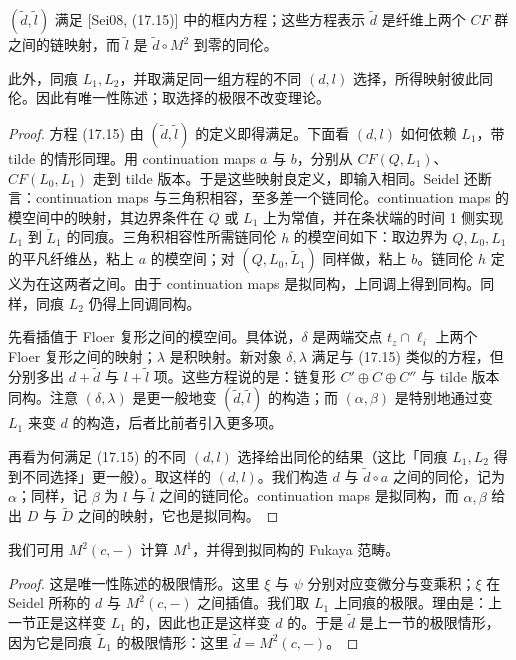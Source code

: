 \begin{claim}\label{claim:boxed}
$(\tilde d,\tilde l)$ 满足 [Sei08, (17.15)] 中的框内方程；这些方程表示 $\tilde d$ 是纤维上两个 $CF$ 群之间的链映射，而 $\tilde l$ 是 $\tilde d\circ M^2$ 到零的同伦。
\end{claim}

此外，同痕 $L_1,L_2$，并取满足同一组方程的不同 $(d,l)$ 选择，所得映射彼此同伦。因此有唯一性陈述；取选择的极限不改变理论。

\begin{proof}
方程 (17.15) 由 $(\tilde d,\tilde l)$ 的定义即得满足。下面看 $(d,l)$ 如何依赖 $L_1$，带 tilde 的情形同理。用 continuation maps $a$ 与 $b$，分别从 $CF(Q,L_1)$、$CF(L_0,L_1)$ 走到 tilde 版本。于是这些映射良定义，即输入相同。Seidel 还断言：continuation maps 与三角积相容，至多差一个链同伦。continuation maps 的模空间中的映射，其边界条件在 $Q$ 或 $L_1$ 上为常值，并在条状端的时间 1 侧实现 $L_1$ 到 $\tilde L_1$ 的同痕。三角积相容性所需链同伦 $h$ 的模空间如下：取边界为 $Q,L_0,L_1$ 的平凡纤维丛，粘上 $a$ 的模空间；对 $(Q,L_0,\tilde L_1)$ 同样做，粘上 $b$。链同伦 $h$ 定义为在这两者之间。由于 continuation maps 是拟同构，上同调上得到同构。同样，同痕 $L_2$ 仍得上同调同构。

先看插值于 Floer 复形之间的模空间。具体说，$\delta$ 是两端交点 $t_z\cap\ell_i$ 上两个 Floer 复形之间的映射；$\lambda$ 是积映射。新对象 $\delta,\lambda$ 满足与 (17.15) 类似的方程，但分别多出 $d+\tilde d$ 与 $l+\tilde l$ 项。这些方程说的是：链复形 $C'\oplus C\oplus C''$ 与 tilde 版本同构。注意 $(\delta,\lambda)$ 是更一般地变 $(\tilde d,\tilde l)$ 的构造；而 $(\alpha,\beta)$ 是特别地通过变 $L_1$ 来变 $d$ 的构造，后者比前者引入更多项。

再看为何满足 (17.15) 的不同 $(d,l)$ 选择给出同伦的结果（这比「同痕 $L_1,L_2$ 得到不同选择」更一般）。取这样的 $(d,l)$。我们构造 $d$ 与 $\tilde d\circ a$ 之间的同伦，记为 $\alpha$；同样，记 $\beta$ 为 $l$ 与 $\tilde l$ 之间的链同伦。continuation maps 是拟同构，而 $\alpha,\beta$ 给出 $D$ 与 $\tilde D$ 之间的映射，它也是拟同构。
\end{proof}

\begin{claim}\label{claim:compute-M1}
我们可用 $M^2(c,-)$ 计算 $M^1$，并得到拟同构的 Fukaya 范畴。
\end{claim}

\begin{proof}
这是唯一性陈述的极限情形。这里 $\xi$ 与 $\psi$ 分别对应变微分与变乘积；$\xi$ 在 Seidel 所称的 $d$ 与 $M^2(c,-)$ 之间插值。我们取 $L_1$ 上同痕的极限。理由是：上一节正是这样变 $L_1$ 的，因此也正是这样变 $d$ 的。于是 $\tilde d$ 是上一节的极限情形，因为它是同痕 $\tilde L_1$ 的极限情形：这里 $\tilde d=M^2(c,-)$。
\end{proof}

